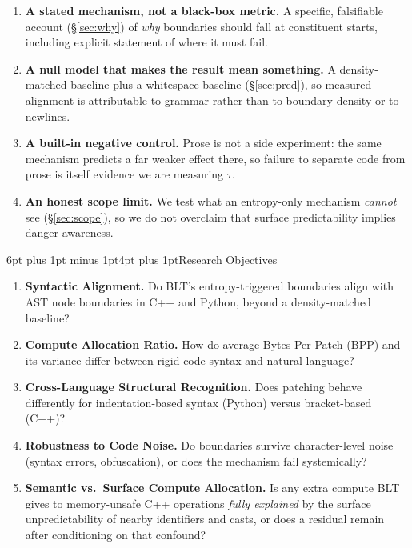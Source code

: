 \documentclass[10pt]{article}
\makeatletter
\renewcommand\section{\@startsection{section}{1}{0pt}%
  {6pt plus 1pt minus 1pt}{4pt plus 1pt}{\normalfont\large\bfseries}}
\makeatother
\begin{document}
\begin{enumerate}
\item \textbf{A stated mechanism, not a black-box metric.} A specific, falsifiable
account (\S\ref{sec:why}) of \emph{why} boundaries should fall at constituent
starts, including explicit statement of where it must fail.
\item \textbf{A null model that makes the result mean something.} A
density-matched baseline plus a whitespace baseline (\S\ref{sec:pred}), so
measured alignment is attributable to grammar rather than to boundary density or
to newlines.
\item \textbf{A built-in negative control.} Prose is not a side experiment: the
same mechanism predicts a far weaker effect there, so failure to separate code
from prose is itself evidence we are measuring $\tau$.
\item \textbf{An honest scope limit.} We test what an entropy-only mechanism
\emph{cannot} see (\S\ref{sec:scope}), so we do not overclaim that surface
predictability implies danger-awareness.
\end{enumerate}

\section{Research Objectives}

\begin{enumerate}[label=\textbf{O\arabic*.}]
\item \textbf{Syntactic Alignment.} Do BLT's entropy-triggered boundaries align
with AST node boundaries in C++ and Python, beyond a density-matched baseline?
\item \textbf{Compute Allocation Ratio.} How do average Bytes-Per-Patch (BPP) and
its variance differ between rigid code syntax and natural language?
\item \textbf{Cross-Language Structural Recognition.} Does patching behave
differently for indentation-based syntax (Python) versus bracket-based (C++)?
\item \textbf{Robustness to Code Noise.} Do boundaries survive character-level
noise (syntax errors, obfuscation), or does the mechanism fail systemically?
\item \textbf{Semantic vs.\ Surface Compute Allocation.} Is any extra compute BLT
gives to memory-unsafe C++ operations \emph{fully explained} by the surface
unpredictability of nearby identifiers and casts, or does a residual remain after
conditioning on that confound?
\end{enumerate}
\end{document}
